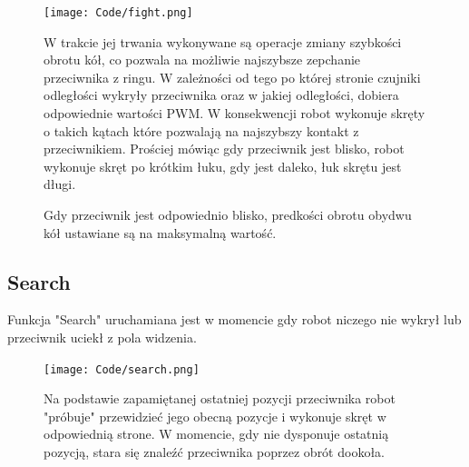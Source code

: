 \documentclass[polish,polish,a4paper]{article}
\begin{document}
     \begin{figure}[!htb]
       \begin{minipage}{0.3\textwidth}

        \centering
        \texttt{[image: Code/fight.png]}
        
       \end{minipage} \hspace{37mm}
       \begin{minipage}{0.5\textwidth}
         
        W trakcie jej trwania wykonywane są operacje zmiany szybkości obrotu kół, co pozwala na możliwie najszybsze zepchanie przeciwnika z ringu. W zależności od tego po której stronie czujniki odległości wykryły przeciwnika oraz w jakiej odległości, dobiera odpowiednie wartości PWM. W konsekwencji robot wykonuje skręty o takich kątach które pozwalają na najszybszy kontakt z przeciwnikiem. 
    \newline\newline
    Prościej mówiąc gdy przeciwnik jest blisko, robot wykonuje skręt po krótkim łuku, gdy jest daleko, łuk skrętu jest długi.
    
    Gdy przeciwnik jest odpowiednio blisko, predkości obrotu obydwu kół ustawiane są na maksymalną wartość.
        
       \end{minipage}
        \end{figure}
    
    \subsection{Search}
    Funkcja "Search" uruchamiana jest w momencie gdy robot niczego nie wykrył lub przeciwnik uciekł z pola widzenia. 

    \begin{figure}[!htb]
       \begin{minipage}{0.3\textwidth}

        \centering
        \texttt{[image: Code/search.png]}
        
       \end{minipage} \hspace{37mm}
       \begin{minipage}{0.5\textwidth}

         Na podstawie zapamiętanej ostatniej pozycji przeciwnika robot "próbuje" przewidzieć jego obecną pozycje i wykonuje skręt w odpowiednią strone. W momencie, gdy nie dysponuje ostatnią pozycją, stara się znaleźć przeciwnika poprzez obrót dookoła. 
      
       \end{minipage}
        \end{figure}
\end{document}
